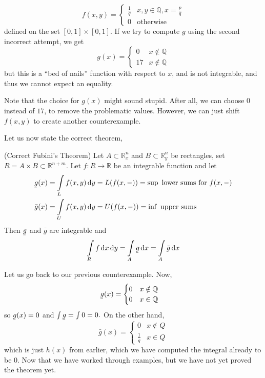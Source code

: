 \documentclass{article}
\newcommand{\ubar}[1]{\underaccent{\bar}{#1}}
\numberwithin{equation}{section}
\begin{document}
\begin{equation}
    f(x,y) = \begin{cases}
        \frac{1}{q} & x,y\in \mathbb{Q}, x=\frac{p}{q} \\
        0           & \text{otherwise}
    \end{cases}
\end{equation}
defined on the set $[0,1]\times [0,1]$. If we try to compute $g$ using the second incorrect attempt, we get
\begin{equation}
    g(x) = \begin{cases}
        0  & x \notin \mathbb{Q} \\
        17 & x \notin \mathbb{Q}
    \end{cases}
\end{equation}
but this is a ``bed of nails'' function with respect to $x$, and is not integrable, and thus we cannot expect an equality.

Note that the choice for $g(x)$ might sound stupid. After all, we can choose $0$ instead of $17$, to remove the problematic values. However, we can just shift $f(x,y)$ to create another counterexample.

Let us now state the correct theorem,
\begin{theorem}
    (Correct Fubini's Theorem) Let $A \subset \mathbb{R}_x^n$ and $B \subset \mathbb{R}_y^n$ be rectangles, set $R=A\times B \subset \mathbb{R}^{n+m}$. Let $f:R\rightarrow \mathbb{R}$ be an integrable function and let
    \begin{align}
        \ubar{g}(x) & = \int\limits_L f(x,y) \dd{y} = L(f(x,-)) = \sup \text{ lower sums for } f(x,-) \\
        \bar{g}(x)  & = \int\limits_U f(x,y) \dd{y} = U(f(x,-)) = \inf \text{ upper sums}
    \end{align}
    Then $\ubar{g}$ and $\bar{g}$ are integrable and
    \begin{equation}
        \int\limits_R f\dd{x}\dd{y} = \int\limits_A \ubar{g} \dd{x} = \int\limits_A \bar{g} \dd{x}
    \end{equation}
\end{theorem}
Let us go back to our previous counterexample. Now,
\begin{align}
    \ubar{g}(x) & = \begin{cases}
        0 & x\notin \mathbb{Q} \\
        0 & x\in \mathbb{Q}
    \end{cases}
\end{align}
so $\ubar{g}(x)=0$ and $\int \ubar{g} = \int 0 = 0.$ On the other hand,
\begin{equation}
    \bar{g}(x) = \begin{cases}
        0           & x\not\in Q \\
        \frac{1}{q} & x \in Q
    \end{cases}
\end{equation}
which is just $h(x)$ from earlier, which we have computed the integral already to be $0$. Now that we have worked through examples, but we have not yet proved the theorem yet.
\end{document}
